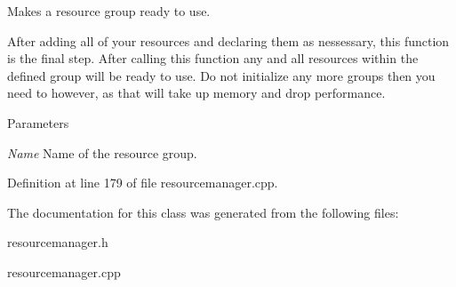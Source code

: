Makes a resource group ready to use. 

After adding all of your resources and declaring them as nessessary, this function is the final step. After calling this function any and all resources within the defined group will be ready to use. Do not initialize any more groups then you need to however, as that will take up memory and drop performance. 
\begin{DoxyParams}{Parameters}
\item[{\em Name}]Name of the resource group. \end{DoxyParams}


Definition at line 179 of file resourcemanager.cpp.



The documentation for this class was generated from the following files:\begin{DoxyCompactItemize}
\item 
resourcemanager.h\item 
resourcemanager.cpp\end{DoxyCompactItemize}
